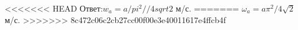 <<<<<<< HEAD
Ответ:$w_a=a/pi^2//4 sqrt 2$ м/с.
=======
$\omega_a=a\pi^2/4 \sqrt{2}$ м/с.
>>>>>>> 8c472c06c2cb27cc00f00e3e40011617e4ffcb4f

